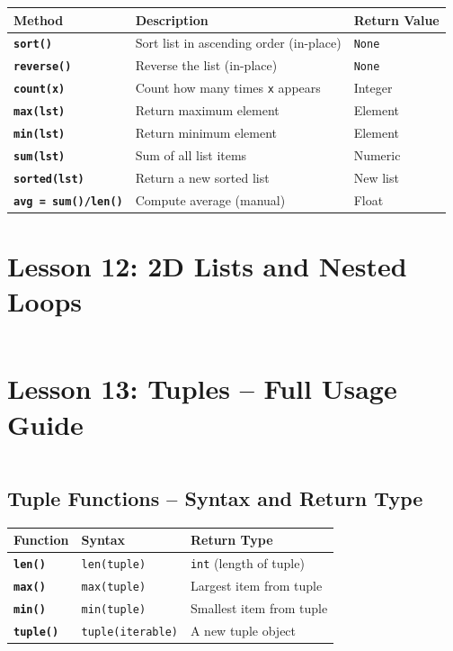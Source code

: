 \documentclass[a4paper,11pt]{article}
\begin{document}
	\begin{tabular}{>{\bfseries}p{3.5cm} p{6cm} p{3.5cm}}
		\toprule
		Method & Description & Return Value \\
		\midrule
		
		\texttt{sort()}        & Sort list in ascending order (in-place) & \texttt{None} \\
		\texttt{reverse()}     & Reverse the list (in-place) & \texttt{None} \\
		\texttt{count(x)}      & Count how many times \texttt{x} appears & Integer \\
		\texttt{max(lst)}      & Return maximum element & Element \\
		\texttt{min(lst)}      & Return minimum element & Element \\
		\texttt{sum(lst)}      & Sum of all list items & Numeric \\
		\texttt{sorted(lst)}   & Return a new sorted list & New list \\
		\texttt{avg = sum()/len()} & Compute average (manual) & Float \\
		
		\bottomrule
	\end{tabular}
	
	
	\section{Lesson 12: 2D Lists and Nested Loops}
	\inputminted{python}{Python_Files/nested_list_guid.py}
	
	\section{Lesson 13: Tuples – Full Usage Guide}
	\inputminted{python}{Python_Files/tuples_guid.py}
	
	\vspace{1em}
	\subsection*{Tuple Functions – Syntax and Return Type}
	
	\begin{tabular}{>{\bfseries}p{3.5cm} p{7cm} p{3cm}}
		\toprule
		Function & Syntax & Return Type \\
		\midrule
		
		\texttt{len()} & \texttt{len(tuple)} & \texttt{int} (length of tuple) \\
		
		\texttt{max()} & \texttt{max(tuple)} & Largest item from tuple \\
		
		\texttt{min()} & \texttt{min(tuple)} & Smallest item from tuple \\
		
		\texttt{tuple()} & \texttt{tuple(iterable)} & A new tuple object \\
		
		\bottomrule
	\end{tabular}
	
\end{document}
